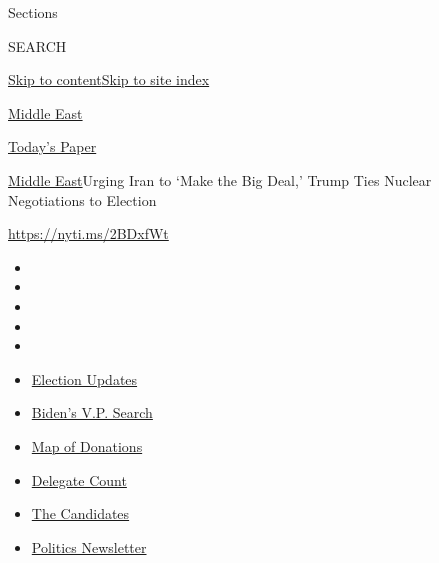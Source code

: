 Sections

SEARCH

\protect\hyperlink{site-content}{Skip to
content}\protect\hyperlink{site-index}{Skip to site index}

\href{https://www.nytimes.com/section/world/middleeast}{Middle East}

\href{https://myaccount.nytimes.com/auth/login?response_type=cookie\&client_id=vi}{}

\href{https://www.nytimes.com/section/todayspaper}{Today's Paper}

\href{/section/world/middleeast}{Middle East}\textbar{}Urging Iran to
`Make the Big Deal,' Trump Ties Nuclear Negotiations to Election

\url{https://nyti.ms/2BDxfWt}

\begin{itemize}
\item
\item
\item
\item
\item
\end{itemize}

\begin{itemize}
\item
  \href{https://www.nytimes.com/2020/07/31/us/elections/biden-vs-trump.html?action=click\&pgtype=Article\&state=default\&region=TOP_BANNER\&context=storylines_menu}{Election
  Updates}
\item
  \href{https://www.nytimes.com/article/biden-vice-president-2020.html?action=click\&pgtype=Article\&state=default\&region=TOP_BANNER\&context=storylines_menu}{Biden's
  V.P. Search}
\item
  \href{https://www.nytimes.com/interactive/2020/07/24/us/politics/trump-biden-campaign-donors.html?action=click\&pgtype=Article\&state=default\&region=TOP_BANNER\&context=storylines_menu}{Map
  of Donations}
\item
  \href{https://www.nytimes.com/interactive/2020/us/elections/delegate-count-primary-results.html?action=click\&pgtype=Article\&state=default\&region=TOP_BANNER\&context=storylines_menu}{Delegate
  Count}
\item
  \href{https://www.nytimes.com/interactive/2019/us/politics/2020-presidential-candidates.html?action=click\&pgtype=Article\&state=default\&region=TOP_BANNER\&context=storylines_menu}{The
  Candidates}
\item
  \href{https://www.nytimes.com/newsletters/politics?action=click\&pgtype=Article\&state=default\&region=TOP_BANNER\&context=storylines_menu}{Politics
  Newsletter}
\end{itemize}

